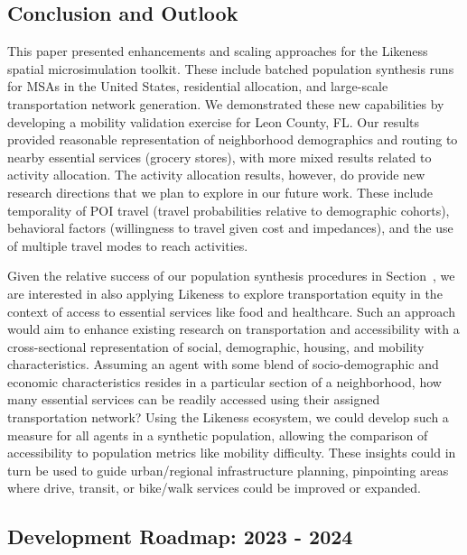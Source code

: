 \subsection{Conclusion and Outlook}\label{section:conclusion-outlook}

This paper presented enhancements and scaling approaches for the Likeness spatial microsimulation toolkit. These include batched population synthesis runs for MSAs in the United States, residential allocation, and large-scale transportation network generation. We demonstrated these new capabilities by developing a mobility validation exercise for Leon County, FL. Our results provided reasonable representation of neighborhood demographics and routing to nearby essential services (grocery stores), with more mixed results related to activity allocation. The activity allocation results, however, do provide new research directions that we plan to explore in our future work. These include temporality of POI travel (travel probabilities relative to demographic cohorts), behavioral factors (willingness to travel given cost and impedances), and the use of multiple travel modes to reach activities. 

Given the relative success of our population synthesis procedures in Section~, we are interested in also applying Likeness to explore transportation equity in the context of access to essential services like food and healthcare. Such an approach would aim to enhance existing research on transportation and accessibility \cite{horner_2015, wood_2016} with a cross-sectional representation of social, demographic, housing, and mobility characteristics. Assuming an agent with some blend of socio-demographic and economic characteristics resides in a particular section of a neighborhood, how many essential services can be readily accessed using their assigned transportation network? Using the Likeness ecosystem, we could develop such a measure for all agents in a synthetic population, allowing the comparison of accessibility to population metrics like mobility difficulty. These insights could in turn be used to guide urban/regional infrastructure planning, pinpointing areas where drive, transit, or bike/walk services could be improved or expanded. 

\subsection{Development Roadmap: 2023 - 2024} \label{section:dev-roadmap}

